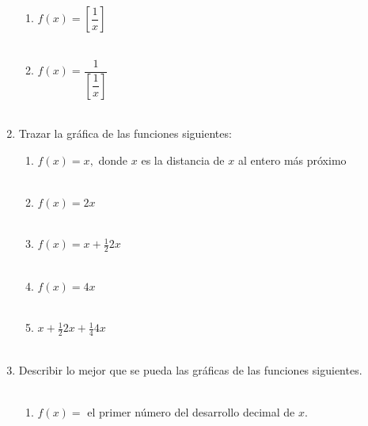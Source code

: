 \begin{enumerate}
\begin{enumerate}[\bfseries (i)]
	\item $f(x)=\left[\dfrac{1}{x}\right]$\\\\

	\item $f(x)=\dfrac{1}{\left[\dfrac{1}{x}\right]}$\\\\

    \end{enumerate}

    \item Trazar la gráfica de las funciones siguientes:
    \begin{enumerate}[\bfseries (a)]
	
	\item $f(x)={x},$ donde ${x}$ es la distancia de $x$ al entero más próximo\\\\
	
	\item $f(x)={2x}$\\\\
	
	\item $f(x)={x}+\frac{1}{2}{2x}$\\\\
	
	\item $f(x)={4x}$\\\\
	
	\item ${x} + \frac{1}{2}{2x} + \frac{1}{4}{4x}$\\\\

    \end{enumerate}

    \item Describir lo mejor que se pueda las gráficas de las funciones siguientes.\\\\
    \begin{enumerate}[\bfseries (i)]
	
	\item $f(x)=$ el primer número del desarrollo decimal de $x$.\\\\


\end{enumerate}
\end{enumerate}

